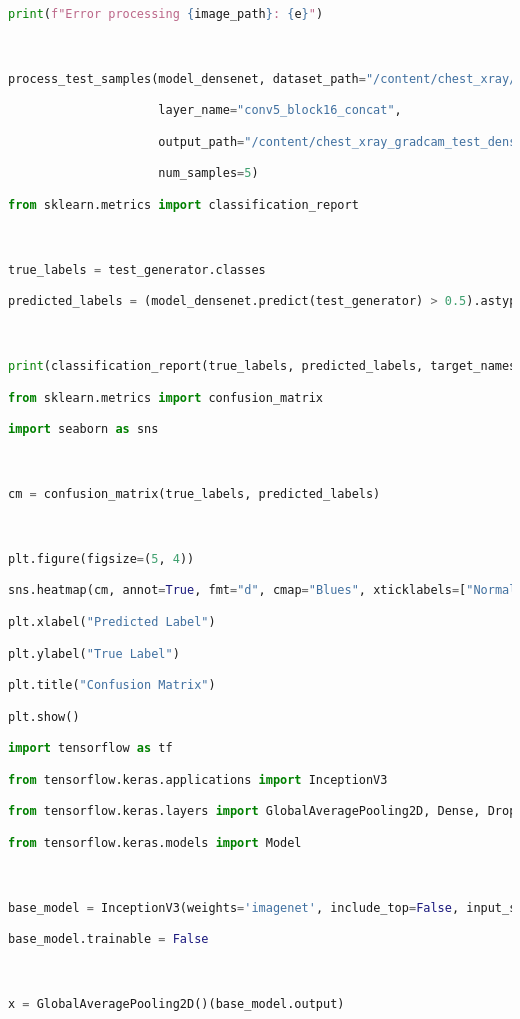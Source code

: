 \documentclass{article}
\begin{document}
\begin{lstlisting}[style=mystyle,language=Python]
                print(f"Error processing {image_path}: {e}")



process_test_samples(model_densenet, dataset_path="/content/chest_xray/test",

                     layer_name="conv5_block16_concat",

                     output_path="/content/chest_xray_gradcam_test_densenet",

                     num_samples=5)

from sklearn.metrics import classification_report



true_labels = test_generator.classes

predicted_labels = (model_densenet.predict(test_generator) > 0.5).astype("int32")



print(classification_report(true_labels, predicted_labels, target_names=["Normal", "Pneumonia"]))

from sklearn.metrics import confusion_matrix

import seaborn as sns



cm = confusion_matrix(true_labels, predicted_labels)



plt.figure(figsize=(5, 4))

sns.heatmap(cm, annot=True, fmt="d", cmap="Blues", xticklabels=["Normal", "Pneumonia"], yticklabels=["Normal", "Pneumonia"])

plt.xlabel("Predicted Label")

plt.ylabel("True Label")

plt.title("Confusion Matrix")

plt.show()

import tensorflow as tf

from tensorflow.keras.applications import InceptionV3

from tensorflow.keras.layers import GlobalAveragePooling2D, Dense, Dropout

from tensorflow.keras.models import Model



base_model = InceptionV3(weights='imagenet', include_top=False, input_shape=(256,256,3))

base_model.trainable = False



x = GlobalAveragePooling2D()(base_model.output)


\end{lstlisting}
\end{document}
